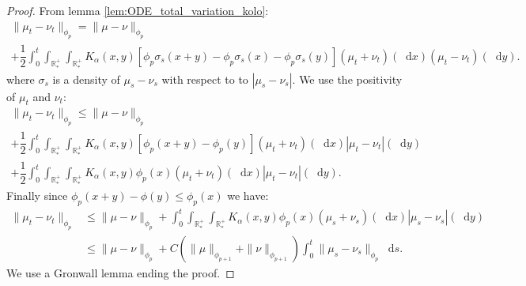\documentclass[11pt,a4paper]{article}
\newcommand{\RRP}{\mathbb{R}^+_*}
\newcommand{\dd}{\mathop{}\!\mathrm{d}}
\begin{document}
\begin{proof}
    From lemma \ref{lem:ODE_total_variation_kolo}:
    \begin{multline*}
        \| \mu_t - \nu_t\|_{\phi_p} = \|\mu- \nu\|_{\phi_p} \\
        + \dfrac12\int_0^t \int_{\RRP}\int_{\RRP} K_\alpha(x,y) \left[\phi_p\sigma_s(x+y) - \phi_p\sigma_s(x) - \phi_p\sigma_s(y) \right]\left(\mu_t + \nu_t\right)(\dd x) \left(\mu_t - \nu_t\right)(\dd y).
    \end{multline*}
    where $\sigma_s$ is a density of $\mu_s - \nu_s$ with respect to to $|\mu_s - \nu_s|$. We use the positivity of $\mu_t$ and $\nu_t$: 
    \begin{multline*}
        \| \mu_t - \nu_t\|_{\phi_p} \leq \|\mu- \nu\|_{\phi_p} \\
        + \dfrac12\int_0^t \int_{\RRP}\int_{\RRP} K_\alpha(x,y) \left[\phi_p(x+y) - \phi_p(y) \right]\left(\mu_t + \nu_t\right)(\dd x) \left|\mu_t - \nu_t\right|(\dd y) \\
        + \dfrac12\int_0^t \int_{\RRP}\int_{\RRP} K_\alpha(x,y)\phi_p(x)\left(\mu_t + \nu_t\right)(\dd x) \left|\mu_t - \nu_t\right|(\dd y).
    \end{multline*}
    Finally since $\phi_p(x+y) - \phi(y) \leq \phi_p(x)$ we have:
    \begin{align*}
        \| \mu_t - \nu_t\|_{\phi_p} &\leq \|\mu- \nu\|_{\phi_p} + \int_0^t \int_{\RRP}\int_{\RRP} K_\alpha(x,y)\phi_p(x)\left(\mu_s + \nu_s\right)(\dd x) \left|\mu_s - \nu_s\right|(\dd y)\\
        &\leq \|\mu- \nu\|_{\phi_p} + C\left(\|\mu\|_{\phi_{p+1}} + \|\nu\|_{\phi_{p+1}}\right) \int_0^t \|\mu_s - \nu_s \|_{\phi_p}\dd s.
    \end{align*}
    We use a Gronwall lemma ending the proof.
\end{proof}
\end{document}
